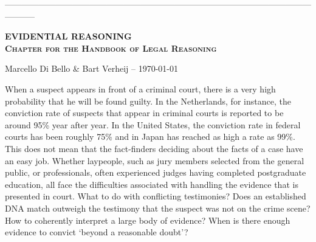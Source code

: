 \documentclass[10pt]{article}
\begin{document}
\thispagestyle{empty}

\vspace{-2cm}
\noindent
-----------------------------------------------------------------------------------------------------------------------


\vspace{5mm}
\noindent
\textsc{\large \bf  EVIDENTIAL REASONING \\ Chapter for the Handbook of Legal Reasoning}

\vspace{3mm}
\noindent
Marcello Di Bello \& Bart Verheij --  \today \\
\vspace{1cm}

\vspace{1cm}



\vspace{1cm}



\tableofcontents

\newpage

\noindent When a suspect appears in front of a criminal court, there is a very high probability that he will be found guilty. In the Netherlands, for instance, the conviction rate of suspects that appear in criminal courts is reported to be around 95\% year after year. 
In the United States, the conviction rate in federal courts has been roughly 75\% and in Japan has reached as high a rate as 99\%. This does not mean that the fact-finders deciding about the facts of a  case have an easy job. Whether laypeople, such as jury members selected from the general public, or professionals, often experienced judges having completed postgraduate education, all face the difficulties associated with handling the evidence that is presented in court. What to do with conflicting testimonies? Does an established DNA match outweigh the testimony that the suspect was not on the crime scene? How to coherently interpret a large body of evidence? 
When is there enough evidence to convict `beyond a reasonable doubt'? 
\end{document}
